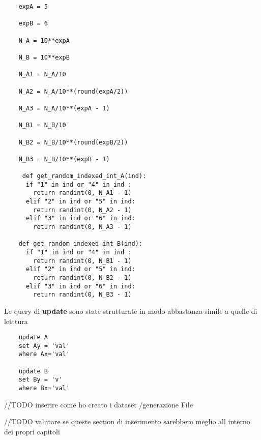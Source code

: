 \begin{verbatim}
    expA = 5

    expB = 6

    N_A = 10**expA 

    N_B = 10**expB

    N_A1 = N_A/10

    N_A2 = N_A/10**(round(expA/2))

    N_A3 = N_A/10**(expA - 1)

    N_B1 = N_B/10

    N_B2 = N_B/10**(round(expB/2))

    N_B3 = N_B/10**(expB - 1)

     def get_random_indexed_int_A(ind):
      if "1" in ind or "4" in ind :
        return randint(0, N_A1 - 1)
      elif "2" in ind or "5" in ind:
        return randint(0, N_A2 - 1)
      elif "3" in ind or "6" in ind:
        return randint(0, N_A3 - 1)

    def get_random_indexed_int_B(ind):
      if "1" in ind or "4" in ind :
        return randint(0, N_B1 - 1)
      elif "2" in ind or "5" in ind:
        return randint(0, N_B2 - 1)
      elif "3" in ind or "6" in ind:
        return randint(0, N_B3 - 1)   
\end{verbatim}

Le query di \textbf{update} sono state strutturate in modo abbastanza simile a quelle di letttura

\begin{verbatim}
    update A
    set Ay = 'val'
    where Ax='val'

    update B
    set By = 'v'
    where Bx='val'
\end{verbatim}

//TODO inserire come ho creato i dataset /generazione File 

//TODO valutare se queste section di inserimento sarebbero meglio all interno dei propri capitoli

% 
